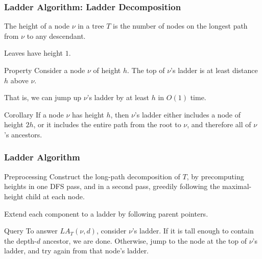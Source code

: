 \documentclass[aspectratio=169]{beamer}
\begin{document}
\begin{frame}
\frametitle{Ladder Algorithm: Ladder Decomposition}

\begin{definition}[Height]
  The \alert{height} of a node $\nu$ in a tree $T$ is the number of nodes
  on the longest path from $\nu$ to any descendant.

  Leaves have height $1$.
\end{definition}

\pause

\begin{block}{Property}
  Consider a node $\nu$ of height $h$.  The top of $\nu$'s ladder is at
  least distance $h$ above $\nu$.

  That is, we can jump up $\nu$'s ladder by at least $h$ in $O(1)$ time.
\end{block}

\pause

\begin{block}{Corollary}
  If a node $\nu$ has height $h$, then $\nu$'s ladder either includes a
  node of height $2h$, or it includes the entire path from the root to
  $\nu$, and therefore all of $\nu$'s ancestors.
\end{block}

\end{frame}

\begin{frame}
\frametitle{Ladder Algorithm}

\begin{block}{Preprocessing}
  Construct the long-path decomposition of $T$, by precomputing heights in
  one DFS pass, and in a second pass, greedily following the
  maximal-height child at each node.

  \vspace{1em}
  Extend each component to a ladder by following parent pointers.
\end{block}

\pause

\begin{block}{Query}
  To answer $LA_T(\nu, d)$, consider $\nu$'s ladder.  If it is tall enough
  to contain the depth-$d$ ancestor, we are done.  Otherwise, jump to the
  node at the top of $\nu$'s ladder, and try again from that node's
  ladder.
\end{block}

\end{frame}
\end{document}

